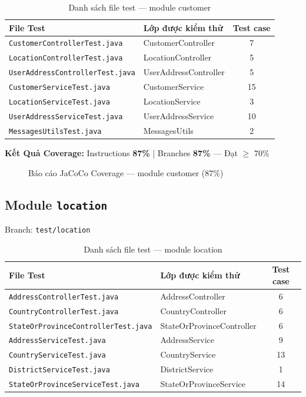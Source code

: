 \begin{table}[H]
\centering
\caption{Danh sách file test --- module customer}
\begin{tabular}{|l|l|c|}
\hline
\textbf{File Test} & \textbf{Lớp được kiểm thử} & \textbf{Test case} \\
\hline
\texttt{CustomerControllerTest.java} & CustomerController & 7 \\
\hline
\texttt{LocationControllerTest.java} & LocationController & 5 \\
\hline
\texttt{UserAddressControllerTest.java} & UserAddressController & 5 \\
\hline
\texttt{CustomerServiceTest.java} & CustomerService & 15 \\
\hline
\texttt{LocationServiceTest.java} & LocationService & 3 \\
\hline
\texttt{UserAddressServiceTest.java} & UserAddressService & 10 \\
\hline
\texttt{MessagesUtilsTest.java} & MessagesUtils & 2 \\
\hline
\end{tabular}
\end{table}

\textbf{Kết Quả Coverage:} Instructions \textbf{87\%} | Branches \textbf{87\%} --- Đạt $\geq$ 70\%

\begin{figure}[H]
\centering
{}
\caption{Báo cáo JaCoCo Coverage --- module customer (87\%)}
\end{figure}

\subsection{Module \texttt{location}}

Branch: \texttt{test/location}

\begin{table}[H]
\centering
\caption{Danh sách file test --- module location}
\begin{tabular}{|l|l|c|}
\hline
\textbf{File Test} & \textbf{Lớp được kiểm thử} & \textbf{Test case} \\
\hline
\texttt{AddressControllerTest.java} & AddressController & 6 \\
\hline
\texttt{CountryControllerTest.java} & CountryController & 6 \\
\hline
\texttt{StateOrProvinceControllerTest.java} & StateOrProvinceController & 6 \\
\hline
\texttt{AddressServiceTest.java} & AddressService & 9 \\
\hline
\texttt{CountryServiceTest.java} & CountryService & 13 \\
\hline
\texttt{DistrictServiceTest.java} & DistrictService & 1 \\
\hline
\texttt{StateOrProvinceServiceTest.java} & StateOrProvinceService & 14 \\
\hline
\end{tabular}
\end{table}

